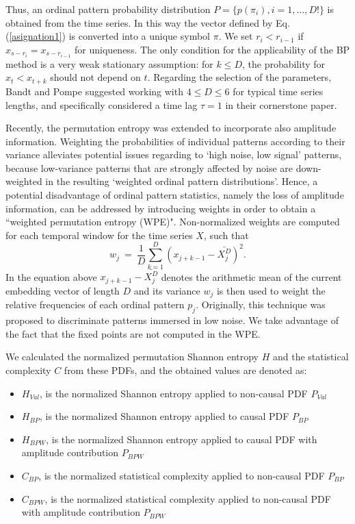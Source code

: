 Thus, an ordinal pattern probability distribution $P = \{ p(\pi_i), i = 1, \dots, D! \}$ is obtained from the time series.
In this way the vector defined by Eq. (\ref{asignation1}) is converted into a unique symbol $\pi$.
We set $r_i < r_{i-1}$ if $x_{s-r_{i}} = x_{s-r_{i-1}}$ for uniqueness.
The only condition for the applicability of the BP method is a very weak stationary assumption: for $k \leq D$, the probability for $x_t < x_{t+k}$ should not depend on $t$.
Regarding the selection of the parameters, Bandt and Pompe suggested working with $4 \leq D \leq 6$ for typical time series lengths, and specifically considered a time lag $\tau = 1$ in their cornerstone paper.

Recently, the permutation entropy was extended to incorporate also amplitude information.
Weighting the probabilities of individual patterns according to their variance alleviates potential issues regarding to ‘high noise, low signal’ patterns, because low-variance patterns that are strongly affected by noise are down-weighted in the resulting ‘weighted ordinal pattern distributions’.
Hence, a potential disadvantage of ordinal pattern statistics, namely the loss of amplitude information, can be addressed by introducing weights in order to obtain a ``weighted permutation entropy (WPE)".
Non-normalized weights are computed for each temporal window for the time series $X$, such that
\begin{equation}
\label{WPE_weigth}
w_j~=~\frac{1}{D}\sum_{k=1}^{D} \left(x_{j+k-1}-\bar{X_j^D}\right)^2.
\end{equation}
In the equation above $x_{j+k-1}-\bar{X_j^D}$ denotes the arithmetic mean of the current embedding vector of length $D$ and its variance $w_j$ is then used to weight the relative frequencies of each ordinal pattern $p_j$.
Originally, this technique was proposed to discriminate patterns immersed in low noise.
We take advantage of the fact that the fixed points are not computed in the WPE.

We calculated the normalized permutation Shannon entropy $H$ and the statistical complexity $C$ from these PDFs, and the obtained values are denoted as:
\begin{itemize}
	\item $H_{Val}$, is the normalized Shannon entropy applied to non-causal PDF $P_{Val}$
	\item $H_{BP}$, is the normalized Shannon entropy applied to causal PDF $P_{BP}$
	\item $H_{BPW}$, is the normalized Shannon entropy applied to causal PDF with amplitude contribution $P_{BPW}$
	\item $C_{BP}$, is the normalized statistical complexity applied to non-causal PDF $P_{BP}$
	\item $C_{BPW}$, is the normalized statistical complexity applied to non-causal PDF with amplitude contribution $P_{BPW} $
\end{itemize}

